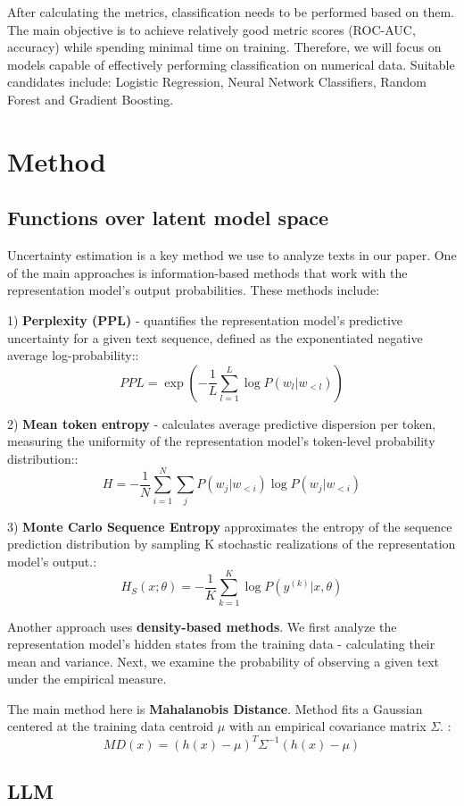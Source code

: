 \documentclass[a4paper, 12pt]{article}
\begin{document}
After calculating the metrics, classification needs to be performed based on them. The main objective is to achieve relatively good metric scores (ROC-AUC, accuracy) while spending minimal time on training. Therefore, we will focus on models capable of effectively performing classification on numerical data. Suitable candidates include: Logistic Regression, Neural Network Classifiers, Random Forest and Gradient Boosting.

\section{Method}
\subsection{Functions over latent model space}
Uncertainty estimation is a key method we use to analyze texts in our paper. One of the main approaches is information-based methods that work with the representation model's output probabilities. These methods include:

1) \textbf{Perplexity (PPL)} - quantifies the representation model’s predictive uncertainty for a given text sequence, defined as the exponentiated negative average log-probability::
$$PPL = \exp\left(-\frac{1}{L} \sum_{l=1}^{L} \log P(w_l | w_{<l})\right)$$

2) \textbf{Mean token entropy} - calculates average predictive dispersion per token, measuring the uniformity of the representation model's token-level probability distribution::
$$H = -\frac{1}{N} \sum_{i=1}^{N} \sum_{j} P(w_j | w_{<i}) \log P(w_j | w_{<i})$$

3) \textbf{Monte Carlo Sequence Entropy} approximates the entropy of the sequence prediction distribution by sampling K stochastic realizations of the representation model's output.:
$$H_S(x; \theta) = - \frac{1}{K} \sum_{k=1}^{K} \log P(y^{(k)} | x, \theta)$$

Another approach uses \textbf{density-based methods}. We first analyze the representation model's hidden states from the training data - calculating their mean and variance. Next, we examine the probability of observing a given text under the empirical measure.

The main method here is \textbf{Mahalanobis Distance}. Method fits a Gaussian centered at the training data centroid $\mu$ with an empirical covariance matrix $\Sigma$. :
$$MD(x) = (h(x) - \mu)^T \Sigma^{-1} (h(x) - \mu)$$

\subsection{LLM}
\end{document}
